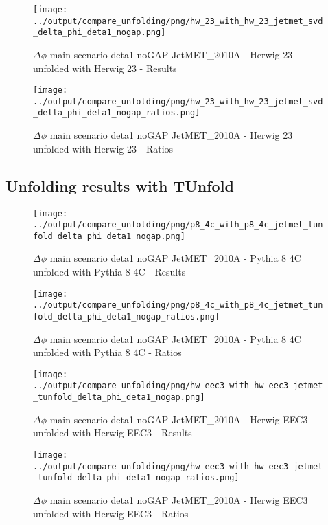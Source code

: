 \documentclass[11pt]{book}
\begin{document}
\begin{figure}[ht]
\centering
\texttt{[image: ../output/compare\_unfolding/png/hw\_23\_with\_hw\_23\_jetmet\_svd\_delta\_phi\_deta1\_nogap.png]}
\caption{$\Delta\phi$ main scenario deta1 noGAP JetMET\_2010A - Herwig 23 unfolded with Herwig 23 - Results}
\label{hw_23_hw_23_jetmet_svd_delta_phi_deta1_nogap_a}
\end{figure}

\begin{figure}[ht]
\centering
\texttt{[image: ../output/compare\_unfolding/png/hw\_23\_with\_hw\_23\_jetmet\_svd\_delta\_phi\_deta1\_nogap\_ratios.png]}
\caption{$\Delta\phi$ main scenario deta1 noGAP JetMET\_2010A - Herwig 23 unfolded with Herwig 23 - Ratios}
\label{hw_23_hw_23_jetmet_svd_delta_phi_deta1_nogap_b}
\end{figure}


\clearpage
\subsection{Unfolding results with TUnfold}

\begin{figure}[ht]
\centering
\texttt{[image: ../output/compare\_unfolding/png/p8\_4c\_with\_p8\_4c\_jetmet\_tunfold\_delta\_phi\_deta1\_nogap.png]}
\caption{$\Delta\phi$ main scenario deta1 noGAP JetMET\_2010A - Pythia 8 4C unfolded with Pythia 8 4C - Results}
\label{p8_p8_jetmet_tunfold_delta_phi_deta1_nogap_a}
\end{figure}

\begin{figure}[ht]
\centering
\texttt{[image: ../output/compare\_unfolding/png/p8\_4c\_with\_p8\_4c\_jetmet\_tunfold\_delta\_phi\_deta1\_nogap\_ratios.png]}
\caption{$\Delta\phi$ main scenario deta1 noGAP JetMET\_2010A - Pythia 8 4C unfolded with Pythia 8 4C - Ratios}
\label{p8_p8_jetmet_tunfold_delta_phi_deta1_nogap_b}
\end{figure}

\begin{figure}[ht]
\centering
\texttt{[image: ../output/compare\_unfolding/png/hw\_eec3\_with\_hw\_eec3\_jetmet\_tunfold\_delta\_phi\_deta1\_nogap.png]}
\caption{$\Delta\phi$ main scenario deta1 noGAP JetMET\_2010A - Herwig EEC3 unfolded with Herwig EEC3 - Results}
\label{hw_eec3_hw_eec3_jetmet_tunfold_delta_phi_deta1_nogap_a}
\end{figure}

\begin{figure}[ht]
\centering
\texttt{[image: ../output/compare\_unfolding/png/hw\_eec3\_with\_hw\_eec3\_jetmet\_tunfold\_delta\_phi\_deta1\_nogap\_ratios.png]}
\caption{$\Delta\phi$ main scenario deta1 noGAP JetMET\_2010A - Herwig EEC3 unfolded with Herwig EEC3 - Ratios}
\label{hw_eec3_hw_eec3_jetmet_tunfold_delta_phi_deta1_nogap_b}
\end{figure}
\end{document}
